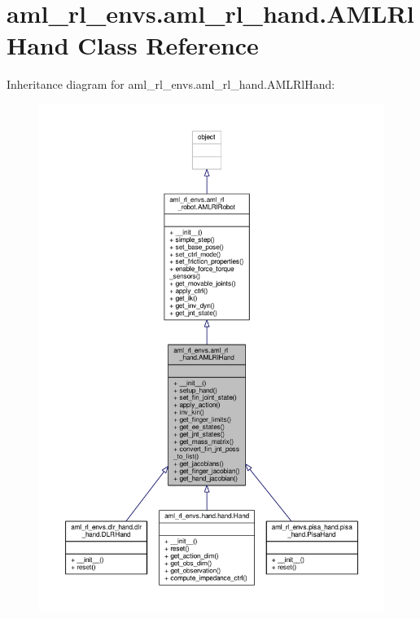 \hypertarget{classaml__rl__envs_1_1aml__rl__hand_1_1_a_m_l_rl_hand}{\section{aml\-\_\-rl\-\_\-envs.\-aml\-\_\-rl\-\_\-hand.\-A\-M\-L\-Rl\-Hand Class Reference}
\label{classaml__rl__envs_1_1aml__rl__hand_1_1_a_m_l_rl_hand}
}


Inheritance diagram for aml\-\_\-rl\-\_\-envs.\-aml\-\_\-rl\-\_\-hand.\-A\-M\-L\-Rl\-Hand\-:
\nopagebreak
\begin{figure}[H]
\begin{center}
\leavevmode
\includegraphics[width=350pt]{classaml__rl__envs_1_1aml__rl__hand_1_1_a_m_l_rl_hand__inherit__graph}
\end{center}
\end{figure}


